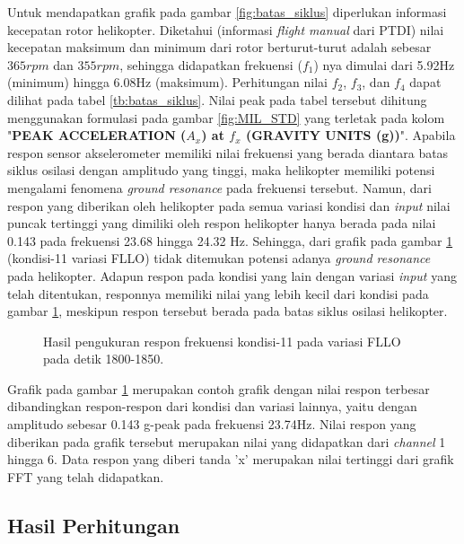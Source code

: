 Untuk mendapatkan grafik pada gambar \ref{fig:batas_siklus} diperlukan informasi kecepatan rotor helikopter. Diketahui (informasi \textit{flight manual} dari PTDI) nilai kecepatan maksimum dan minimum dari rotor berturut-turut adalah sebesar $365 rpm$ dan $355 rpm$, sehingga didapatkan frekuensi ($f_1$) nya dimulai dari 5.92Hz (minimum) hingga 6.08Hz (maksimum). Perhitungan nilai $f_2$, $f_3$, dan $f_4$ dapat dilihat pada tabel \ref{tb:batas_siklus}. Nilai peak pada tabel tersebut dihitung menggunakan formulasi pada gambar \ref{fig:MIL_STD} yang terletak pada kolom "\textbf{PEAK ACCELERATION ($A_x$) at $f_x$ (GRAVITY UNITS (g))}". Apabila respon sensor akselerometer memiliki nilai frekuensi yang berada diantara batas siklus osilasi dengan amplitudo yang tinggi, maka helikopter memiliki potensi mengalami fenomena \textit{ground resonance} pada frekuensi tersebut. Namun, dari respon yang diberikan oleh helikopter pada semua variasi kondisi dan \textit{input} nilai puncak tertinggi yang dimiliki oleh respon helikopter hanya berada pada nilai 0.143 pada frekuensi 23.68 hingga 24.32 Hz. Sehingga, dari grafik pada gambar \ref{fig:11_FLLO} (kondisi-11 variasi FLLO) tidak ditemukan potensi adanya \textit{ground resonance} pada helikopter. Adapun respon pada kondisi yang lain dengan variasi \textit{input} yang telah ditentukan, responnya memiliki nilai yang lebih kecil dari kondisi pada gambar \ref{fig:11_FLLO}, meskipun respon tersebut berada pada batas siklus osilasi helikopter.

\begin{figure}[h]
	\centering
	\caption{Hasil pengukuran respon frekuensi kondisi-11 pada variasi FLLO pada detik 1800-1850.}
	\label{fig:11_FLLO}
\end{figure}

Grafik pada gambar \ref{fig:11_FLLO} merupakan contoh grafik dengan nilai respon terbesar dibandingkan respon-respon dari kondisi dan variasi lainnya, yaitu dengan amplitudo sebesar 0.143 g-peak pada frekuensi 23.74Hz. Nilai respon yang diberikan pada grafik tersebut merupakan nilai yang didapatkan dari \textit{channel} 1 hingga 6. Data respon yang diberi tanda 'x' merupakan nilai tertinggi dari grafik FFT yang telah didapatkan.

\subsection{Hasil Perhitungan}

